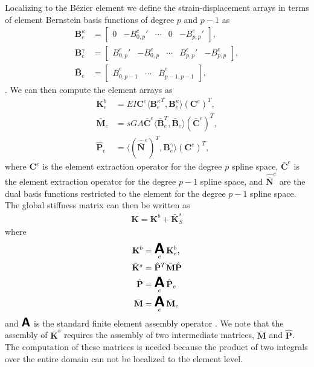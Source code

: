 \documentclass{article}
\DeclareMathOperator*{\A}{ \mathlarger{\mathlarger{\mathlarger{\boldsymbol{\mathsf{A}}}}} }
\begin{document}
Localizing to the B\'{e}zier element we define the strain-displacement arrays in terms of element Bernstein basis functions of degree $p$ and $p-1$ as
\begin{align}
	\mathbf{B}_e^\kappa 
    	&= \begin{bmatrix} 0 & -{B^e_{0,p}}' & \cdots & 0 & -{B^e_{p,p}}' \end{bmatrix}, \\
    \mathbf{B}_e^\gamma
    	&= \begin{bmatrix} {B^e_{0,p}}' & -B^e_{0,p} & \cdots & {B^e_{p,p}}' & -B^e_{p,p} \end{bmatrix}, \\
    \bar{\mathbf{B}}_e
    	&= \begin{bmatrix} \bar{B}^e_{0,p-1} & \cdots & \bar{B}^e_{p-1,p-1} \end{bmatrix},
\end{align}
. We can then compute the element arrays as
\begin{align}
\mathbf{K}_e^b &= EI\mathbf{C}^e\langle{{\mathbf{B}_e^\kappa}^T,\mathbf{B}_e^\kappa}\rangle(\mathbf{C}^e)^T, \label{eq:symmetric_timoshenko}\\
\bar{\mathbf{M}}_e &= s{GA}\bar{\mathbf{C}}^e\langle{\bar{\mathbf{B}}_e^T,\bar{\mathbf{B}}_e}\rangle(\bar{\mathbf{C}}^e)^T, \\
{\hat{\mathbf{P}}_e} &= \langle{(\hat{\bar{\mathbf{N}}}^e)^T,\mathbf{B}^\gamma_e}\rangle(\mathbf{C}^e)^T \label{eq:P-hat-elem},
\end{align}
where $\mathbf{C}^e$ is the element extraction operator for the degree $p$ spline space, $\bar{\mathbf{C}}^e$ is the element extraction operator for the degree $p-1$ spline space, and $\hat{\bar{\mathbf{N}}}^e$ are the dual basis functions restricted to the element for the degree $p-1$ spline space. The global stiffness matrix can then be written as
\begin{align}
	\mathbf{K} = \mathbf{K}^b + \bar{\mathbf{K}}^s_S \label{eqn:symmetric_b_bar_timoshenko_stiffness}
\end{align}
where
\begin{align}
	\mathbf{K}^b &=\A_e\mathbf{K}_e^b,\label{eqn:bending_stiffness} \\
	\bar{\mathbf{K}}^s&={\hat{\mathbf{P}}}^T\bar{\mathbf{M}}{\hat{\mathbf{P}}}\label{eqn:shear_stiffness} \\
	{\hat{\mathbf{P}}} &=\A_e{\hat{\mathbf{P}}_e} \label{eq:P-hat-global}\\
    \bar{\mathbf{M}} &=\A_e\bar{\mathbf{M}}_e
\end{align}
and $\A$ is the standard finite element assembly operator \cite{hughes_finite_2012}. We note that the assembly of $\bar{\mathbf{K}}^s$ requires the assembly of two intermediate matrices, $\bar{\mathbf{M}}$ and ${\hat{\mathbf{P}}}$. The computation of these matrices is needed because the product of two integrals over the entire domain can not be localized to the element level.
\end{document}
